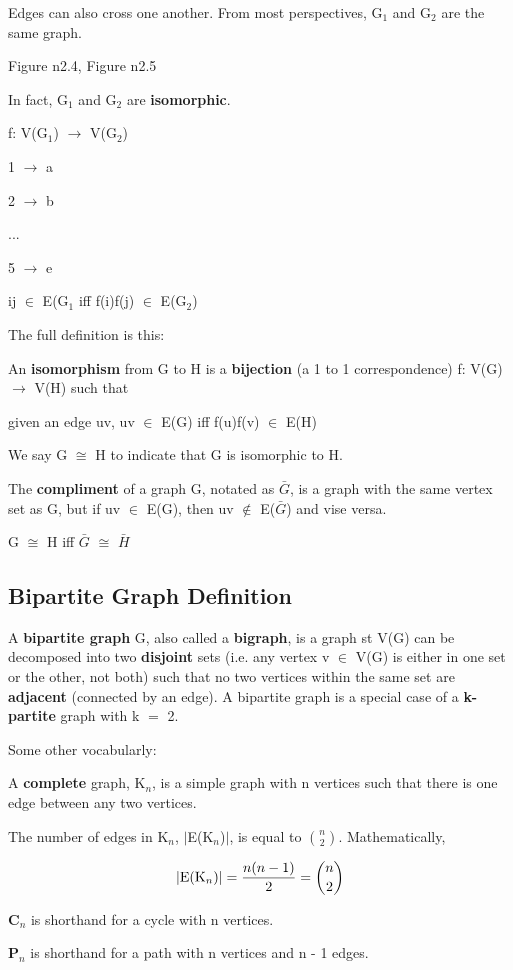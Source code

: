 \documentclass{article}
\newcommand{\mt}[1]{\ensuremath{#1}}
\newcommand\ssc[2][\DefaultOpt]{%
  \def\DefaultOpt{#2}%
  \subsection[#1]{#2}%
}
\newcommand{\mem}{\mt{\in} }
\newcommand{\lra}{ \mt{\longrightarrow} } %
\newcommand{\av}[1]{\mt{|}#1\mt{|}}  %
\newcommand{\ms}{\mt{\operatorname{-}} }
\newcommand{\eql}{ \mt{\operatorname{=}} }
\newcommand{\uw}[2]{#1\mt{_{#2}}}
\newcommand{\nck}[2]{\mt{{#1 \choose #2}}}
\newcommand{\eqn}[1]{\[#1\]}
\begin{document}
Edges can also cross one another. From most perspectives, \uw{G}{1} and \uw{G}{2} are the same graph.

Figure n2.4, Figure n2.5

In fact, \uw{G}{1} and \uw{G}{2} are \textbf{isomorphic}.

f: V(\uw{G}{1}) \lra V(\uw{G}{2})

1 \lra a

2 \lra b

...

5 \lra e

ij \mem E(\uw{G}{1} iff f(i)f(j) \mem E(\uw{G}{2})

The full definition is this:

An \textbf{isomorphism} from G to H is a \textbf{bijection} (a 1 to 1 correspondence) f: V(G) \lra V(H) such that

given an edge uv, uv \mem E(G) iff f(u)f(v) \mem E(H)

We say G $\cong$ H to indicate that G is isomorphic to H.

The \textbf{compliment} of a graph G, notated as $\bar G$, is a graph with the same vertex set as G, but if uv \mem E(G), then uv $\not\in$ E($\bar G$) and vise versa.

G $\cong$ H iff $\bar G$ $\cong$ $\bar H$

\ssc{Bipartite Graph Definition}{

A \textbf{bipartite graph} G, also called a \textbf{bigraph}, is a graph st V(G) can be decomposed into two \textbf{disjoint} sets (i.e. any vertex v \mem V(G) is either in one set or the other, not both) such that no two vertices within the same set are \textbf{adjacent} (connected by an edge). A bipartite graph is a special case of a \textbf{k-partite} graph with k\eql 2.

}

Some other vocabularly:

A \textbf{complete} graph, \uw{K}{n}, is a simple graph with n vertices such that there is one edge between any two vertices.

The number of edges in \uw{K}{n}, \av{E(\uw{K}{n})}, is equal to \nck{n}{2}. Mathematically,

\eqn{|\textrm{E(\uw{K}{n})}| = \frac{n(n - 1)}{2} = \nck{n}{2}}

\textbf{\uw{C}{n}} is shorthand for a cycle with n vertices.

\textbf{\uw{P}{n}} is shorthand for a path with n vertices and n \ms 1 edges.
\end{document}
